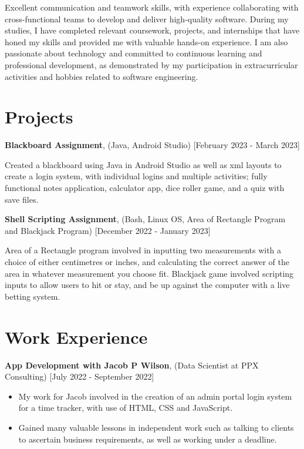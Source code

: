 \documentclass[10pt]{article}
\begin{document}
{Excellent communication and teamwork skills, with experience collaborating with cross-functional teams to develop and deliver high-quality software.
During my studies, I have completed relevant coursework, projects, and internships that have honed my skills and provided me with valuable hands-on experience. I am also passionate about technology and committed to continuous learning and professional development, as demonstrated by my participation in extracurricular activities and hobbies related to software engineering.

\section*{\bf Projects}
{\bf Blackboard Assignment}, (Java, Android Studio) [February 2023 - March 2023]
\setlength{\itemsep}{0.10ex}
\item Created a blackboard using Java in Android Studio as well as xml layouts to create a login system, with individual logins and multiple activities; fully functional notes application, calculator app, dice roller game, and a quiz with save files.

\item {\bf Shell Scripting Assignment}, (Bash, Linux OS, Area of Rectangle Program and Blackjack Program) [December 2022 - January 2023]
\setlength{\itemsep}{0.10ex}
\item Area of a Rectangle program involved in inputting two measurements with a choice of either centimetres or inches, and calculating the correct answer of the area in whatever measurement you choose fit. Blackjack game involved scripting inputs to allow users to hit or stay, and be up against the computer with a live betting system.



\section*{\bf Work Experience}


{\bf App Development with Jacob P Wilson}, (Data Scientist at PPX Consulting) [July 2022 - September 2022]
\begin{itemize}
\setlength{\itemsep}{0.10ex}
\item My work for Jacob involved in the creation of an admin portal login system for a time tracker, with use of HTML, CSS and JavaScript. 
\item Gained many valuable lessons in independent work such as talking to clients to ascertain
business requirements, as well as working under a deadline.
\end{itemize}

}
\end{document}
